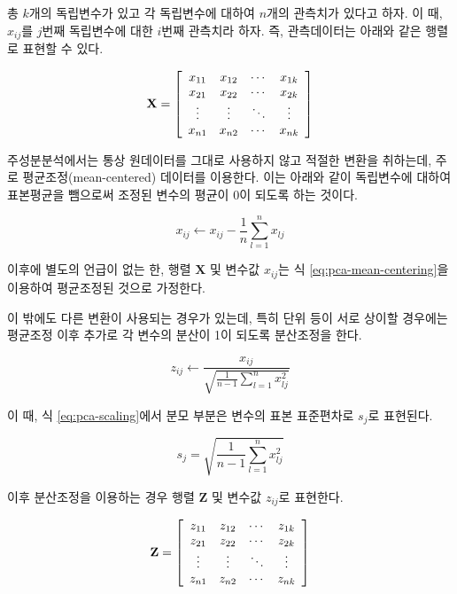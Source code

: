 \documentclass[]{book}
\begin{document}
총 \(k\)개의 독립변수가 있고 각 독립변수에 대하여 \(n\)개의 관측치가 있다고 하자. 이 때, \(x_{ij}\)를 \(j\)번째 독립변수에 대한 \(i\)번째 관측치라 하자. 즉, 관측데이터는 아래와 같은 행렬로 표현할 수 있다.

\begin{equation*}
\mathbf{X} = \left[ \begin{array}{c c c c}
x_{11} & x_{12} & \cdots & x_{1k}\\
x_{21} & x_{22} & \cdots & x_{2k}\\
\vdots & \vdots & \ddots & \vdots \\
x_{n1} & x_{n2} & \cdots & x_{nk}
\end{array} \right]
\end{equation*}

주성분분석에서는 통상 원데이터를 그대로 사용하지 않고 적절한 변환을 취하는데, 주로 평균조정(mean-centered) 데이터를 이용한다. 이는 아래와 같이 독립변수에 대하여 표본평균을 뺌으로써 조정된 변수의 평균이 0이 되도록 하는 것이다.

\begin{equation}
x_{ij} \leftarrow x_{ij} - \frac{1}{n} \sum_{l = 1}^{n} x_{lj} \label{eq:pca-mean-centering}
\end{equation}

이후에 별도의 언급이 없는 한, 행렬 \(\mathbf{X}\) 및 변수값 \(x_{ij}\)는 식 \eqref{eq:pca-mean-centering}을 이용하여 평균조정된 것으로 가정한다.

이 밖에도 다른 변환이 사용되는 경우가 있는데, 특히 단위 등이 서로 상이할 경우에는 평균조정 이후 추가로 각 변수의 분산이 1이 되도록 분산조정을 한다.

\begin{equation*}
z_{ij} \leftarrow \frac{x_{ij}}{\sqrt{\frac{1}{n - 1} \sum_{l =1}^{n} x_{lj}^2}} \label{eq:pca-scaling}
\end{equation*}

이 때, 식 \eqref{eq:pca-scaling}에서 분모 부분은 변수의 표본 표준편차로 \(s_j\)로 표현된다.

\begin{equation*}
s_{j} = \sqrt{\frac{1}{n - 1} \sum_{l =1}^{n} x_{lj}^2}
\end{equation*}

이후 분산조정을 이용하는 경우 행렬 \(\mathbf{Z}\) 및 변수값 \(z_{ij}\)로 표현한다.

\begin{equation*}
\mathbf{Z} = \left[ \begin{array}{c c c c}
z_{11} & z_{12} & \cdots & z_{1k}\\
z_{21} & z_{22} & \cdots & z_{2k}\\
\vdots & \vdots & \ddots & \vdots \\
z_{n1} & z_{n2} & \cdots & z_{nk}
\end{array} \right]
\end{equation*}
\end{document}
